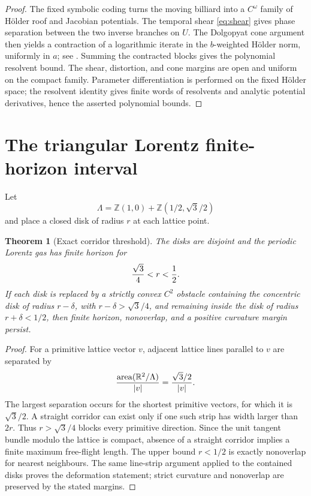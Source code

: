 \documentclass[11pt,reqno]{amsart}
\newtheorem{theorem}{Theorem}[section]
\theoremstyle{definition}
\theoremstyle{remark}
\newcommand{\R}{\mathbb R}
\newcommand{\abs}[1]{\left\lvert #1\right\rvert}
\begin{document}
\begin{proof}
The fixed symbolic coding turns the moving billiard into a $C^\omega$ family
of Hölder roof and Jacobian potentials.  The temporal shear
\eqref{eq:shear} gives phase separation between the two inverse branches on
$U$.  The Dolgopyat cone argument then yields a contraction of a logarithmic
iterate in the $b$-weighted Hölder norm, uniformly in $a$; see
\cite{Dolgopyat1998,Stoyanov2011}.  Summing the contracted blocks gives the
polynomial resolvent bound.  The shear, distortion, and cone margins are open
and uniform on the compact family.  Parameter differentiation is performed on
the fixed Hölder space; the resolvent identity gives finite words of resolvents
and analytic potential derivatives, hence the asserted polynomial bounds.
\end{proof}

\section{The triangular Lorentz finite-horizon interval}

Let
\[
 \Lambda=\mathbb Z(1,0)+\mathbb Z(1/2,\sqrt3/2)
\]
and place a closed disk of radius $r$ at each lattice point.

\begin{theorem}[Exact corridor threshold]\label{thm:triangle}
The disks are disjoint and the periodic Lorentz gas has finite horizon for
\begin{equation}\label{eq:triangle-window}
 {\sqrt3\over4}<r<{1\over2}.
\end{equation}
If each disk is replaced by a strictly convex $C^2$ obstacle containing the
concentric disk of radius $r-\delta$, with
$r-\delta>\sqrt3/4$, and remaining inside the disk of radius $r+\delta<1/2$,
then finite horizon, nonoverlap, and a positive curvature margin persist.
\end{theorem}

\begin{proof}
For a primitive lattice vector $v$, adjacent lattice lines parallel to $v$
are separated by
\[
 {\operatorname{area}(\R^2/\Lambda)\over\abs v}
 ={\sqrt3/2\over\abs v}.
\]
The largest separation occurs for the shortest primitive vectors, for which it
is $\sqrt3/2$.  A straight corridor can exist only if one such strip has width
larger than $2r$.  Thus $r>\sqrt3/4$ blocks every primitive direction.  Since
the unit tangent bundle modulo the lattice is compact, absence of a straight
corridor implies a finite maximum free-flight length.  The upper bound
$r<1/2$ is exactly nonoverlap for nearest neighbours.  The same line-strip
argument applied to the contained disks proves the deformation statement;
strict curvature and nonoverlap are preserved by the stated margins.
\end{proof}
\end{document}
